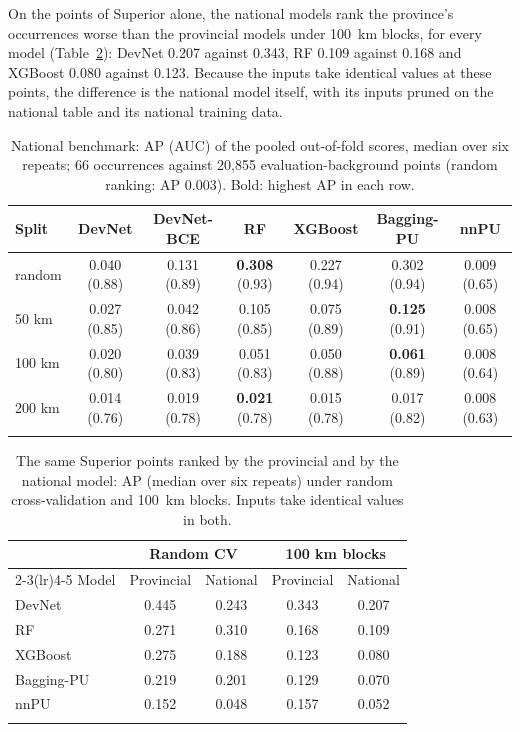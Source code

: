 \documentclass[pdflatex,sn-apa]{sn-jnl}
\begin{document}
On the points of Superior alone, the national models rank the province's occurrences worse than the provincial models under 100~km blocks, for every model (Table~\ref{tab:nat-superior}): DevNet 0.207 against 0.343, RF 0.109 against 0.168 and XGBoost 0.080 against 0.123. Because the inputs take identical values at these points, the difference is the national model itself, with its inputs pruned on the national table and its national training data.

\begin{table}[t]
\caption{National benchmark: AP (AUC) of the pooled out-of-fold scores, median over six repeats; 66 occurrences against 20,855 evaluation-background points (random ranking: AP 0.003). Bold: highest AP in each row.}\label{tab:nat-benchmark}
\scriptsize
\setlength{\tabcolsep}{2.5pt}
\begin{tabular*}{\textwidth}{@{\extracolsep\fill}lcccccc}
\toprule
Split & DevNet & DevNet-BCE & RF & XGBoost & Bagging-PU & nnPU \\
\midrule
random & 0.040 (0.88) & 0.131 (0.89) & \textbf{0.308} (0.93) & 0.227 (0.94) & 0.302 (0.94) & 0.009 (0.65) \\
50 km & 0.027 (0.85) & 0.042 (0.86) & 0.105 (0.85) & 0.075 (0.89) & \textbf{0.125} (0.91) & 0.008 (0.65) \\
100 km & 0.020 (0.80) & 0.039 (0.83) & 0.051 (0.83) & 0.050 (0.88) & \textbf{0.061} (0.89) & 0.008 (0.64) \\
200 km & 0.014 (0.76) & 0.019 (0.78) & \textbf{0.021} (0.78) & 0.015 (0.78) & 0.017 (0.82) & 0.008 (0.63) \\
\botrule
\end{tabular*}
\end{table}

\begin{table}[t]
\caption{The same Superior points ranked by the provincial and by the national model: AP (median over six repeats) under random cross-validation and 100~km blocks. Inputs take identical values in both.}\label{tab:nat-superior}
\footnotesize
\begin{tabular*}{0.8\textwidth}{@{\extracolsep\fill}lcccc}
\toprule
 & \multicolumn{2}{c}{Random CV} & \multicolumn{2}{c}{100 km blocks} \\
\cmidrule(lr){2-3}\cmidrule(lr){4-5}
Model & Provincial & National & Provincial & National \\
\midrule
DevNet & 0.445 & 0.243 & 0.343 & 0.207 \\
RF & 0.271 & 0.310 & 0.168 & 0.109 \\
XGBoost & 0.275 & 0.188 & 0.123 & 0.080 \\
Bagging-PU & 0.219 & 0.201 & 0.129 & 0.070 \\
nnPU & 0.152 & 0.048 & 0.157 & 0.052 \\
\botrule
\end{tabular*}
\end{table}
\end{document}
